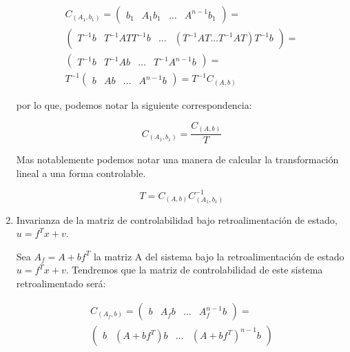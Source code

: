 \begin{enumerate}
                \begin{multline}
                C_{(A_1, b_1)} =
                \begin{pmatrix}
                b_1 & A_1 b_1 & \dots & A^{n-1} b_1
                \end{pmatrix} = \\
                \begin{pmatrix}
                T^{-1} b & T^{-1} A T T^{-1} b & \dots & (T^{-1} A T \dots T^{-1} A T) T^{-1} b
                \end{pmatrix} = \\
                \begin{pmatrix}
                T^{-1} b & T^{-1} A b & \dots & T^{-1} A^{n-1} b
                \end{pmatrix} = \\
                T^{-1}
                \begin{pmatrix}
                b & A b & \dots & A^{n-1} b
                \end{pmatrix} =
                T^{-1} C_{(A, b)} \nonumber
                \end{multline}

                por lo que, podemos notar la siguiente correspondencia:

                \begin{equation*}
                    C_{(A_1, b_1)} = \frac{C_{(A, b)}}{T}
                \end{equation*}

                Mas notablemente podemos notar una manera de calcular la transformación lineal a una forma controlable.

                \begin{equation}
                    T = C_{(A, b)} C_{(A_1, b_1)}^{-1}
                \end{equation}

            \item Invarianza de la matriz de controlabilidad bajo retroalimentación de estado, $u = f^T x + v$.

                Sea $A_f = A + b f^T$ la matriz A del sistema bajo la retroalimentación de estado $u = f^T x + v$. Tendremos que la matriz de controlabilidad de este sistema retroalimentado será:

                \begin{multline*}
                C_{(A_f, b)} =
                \begin{pmatrix}
                b & A_f b & \dots & A_f^{n-1} b
                \end{pmatrix} = \\
                \begin{pmatrix}
                b & \left( A + b f^T \right) b & \dots & \left( A + b f^T \right)^{n-1} b
                \end{pmatrix}
                \end{multline*}


\end{enumerate}
